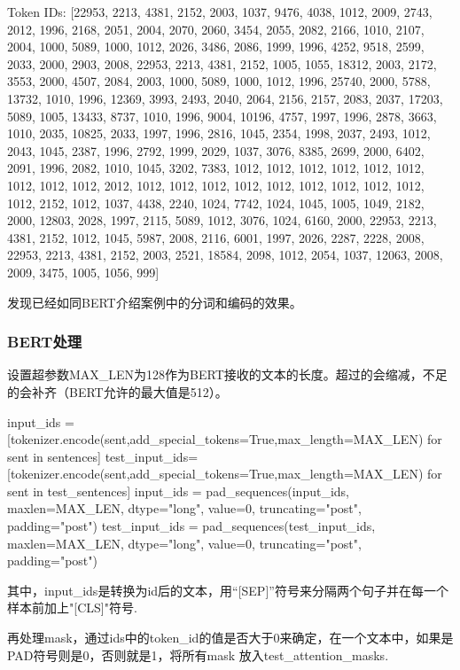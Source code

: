 \documentclass[a4paper,AutoFakeBold,AutoFakeSlant]{ctexart}
\begin{document}
\begin{framed}
Token IDs:  [22953, 2213, 4381, 2152, 2003, 1037, 9476, 4038, 1012, 2009, 2743, 2012, 1996, 2168, 2051, 2004, 2070, 2060, 3454, 2055, 2082, 2166, 1010, 2107, 2004, 1000, 5089, 1000, 1012, 2026, 3486, 2086, 1999, 1996, 4252, 9518, 2599, 2033, 2000, 2903, 2008, 22953, 2213, 4381, 2152, 1005, 1055, 18312, 2003, 2172, 3553, 2000, 4507, 2084, 2003, 1000, 5089, 1000, 1012, 1996, 25740, 2000, 5788, 13732, 1010, 1996, 12369, 3993, 2493, 2040, 2064, 2156, 2157, 2083, 2037, 17203, 5089, 1005, 13433, 8737, 1010, 1996, 9004, 10196, 4757, 1997, 1996, 2878, 3663, 1010, 2035, 10825, 2033, 1997, 1996, 2816, 1045, 2354, 1998, 2037, 2493, 1012, 2043, 1045, 2387, 1996, 2792, 1999, 2029, 1037, 3076, 8385, 2699, 2000, 6402, 2091, 1996, 2082, 1010, 1045, 3202, 7383, 1012, 1012, 1012, 1012, 1012, 1012, 1012, 1012, 1012, 2012, 1012, 1012, 1012, 1012, 1012, 1012, 1012, 1012, 1012, 1012, 2152, 1012, 1037, 4438, 2240, 1024, 7742, 1024, 1045, 1005, 1049, 2182, 2000, 12803, 2028, 1997, 2115, 5089, 1012, 3076, 1024, 6160, 2000, 22953, 2213, 4381, 2152, 1012, 1045, 5987, 2008, 2116, 6001, 1997, 2026, 2287, 2228, 2008, 22953, 2213, 4381, 2152, 2003, 2521, 18584, 2098, 1012, 2054, 1037, 12063, 2008, 2009, 3475, 1005, 1056, 999]
\end{framed}

发现已经如同BERT介绍案例中的分词和编码的效果。

\subsubsection{BERT处理}
设置超参数MAX\_LEN为128作为BERT接收的文本的长度。超过的会缩减，不足的会补齐（BERT允许的最大值是512）。
\begin{python}
input_ids = [tokenizer.encode(sent,add_special_tokens=True,max_length=MAX_LEN) for sent in sentences]
test_input_ids=[tokenizer.encode(sent,add_special_tokens=True,max_length=MAX_LEN) for sent in test_sentences]
input_ids = pad_sequences(input_ids, maxlen=MAX_LEN, dtype="long", 
                          value=0, truncating="post", padding="post")
test_input_ids = pad_sequences(test_input_ids, maxlen=MAX_LEN, dtype="long", 
                          value=0, truncating="post", padding="post")
\end{python}
其中，input\_ids是转换为id后的文本，用“[SEP]”符号来分隔两个句子并在每一个样本前加上"[CLS]"符号.

再处理mask，通过ids中的token\_id的值是否大于0来确定，在一个文本中，如果是PAD符号则是0，否则就是1，将所有mask
放入test\_attention\_masks.
\end{document}
